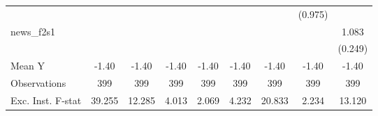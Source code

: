 {\begin{tabular}{l*{8}{c}}
            &                     &                     &                     &                     &                     &                     &     (0.975)         &                     \\
\addlinespace
news\_f2s1   &                     &                     &                     &                     &                     &                     &                     &       1.083\sym{***}\\
            &                     &                     &                     &                     &                     &                     &                     &     (0.249)         \\
\midrule
Mean Y      &       -1.40         &       -1.40         &       -1.40         &       -1.40         &       -1.40         &       -1.40         &       -1.40         &       -1.40         \\
Observations&         399         &         399         &         399         &         399         &         399         &         399         &         399         &         399         \\
Exc. Inst. F-stat&      39.255         &      12.285         &       4.013         &       2.069         &       4.232         &      20.833         &       2.234         &      13.120         \\
\bottomrule
\end{tabular}
}
